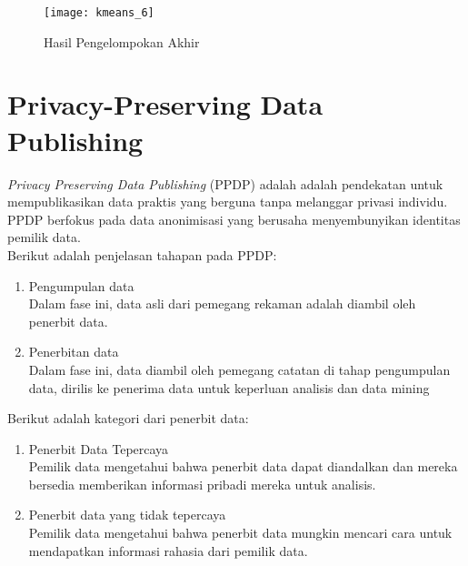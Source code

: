 \begin{enumerate}
\begin{figure}[H]
	\centering
	\texttt{[image: kmeans\_6]}
	\caption{Hasil Pengelompokan Akhir}
	\label{fig:kmeans_6}
\end{figure}



\end{enumerate}

\section{Privacy-Preserving Data Publishing} 
\textit{Privacy Preserving Data Publishing} (PPDP) adalah adalah pendekatan untuk mempublikasikan data praktis yang berguna tanpa melanggar privasi individu. PPDP berfokus pada data anonimisasi yang berusaha menyembunyikan identitas pemilik data.
\\

\noindent Berikut adalah penjelasan tahapan pada PPDP:

\begin{enumerate}

\item Pengumpulan data \\
Dalam fase ini, data asli dari pemegang rekaman adalah diambil oleh penerbit data.

\item Penerbitan data \\
Dalam fase ini, data diambil oleh pemegang catatan di tahap pengumpulan data, dirilis ke penerima data untuk keperluan analisis dan data mining

\end{enumerate}

\noindent Berikut adalah kategori dari penerbit data:
\begin{enumerate}

\item Penerbit Data Tepercaya \\
Pemilik data mengetahui bahwa penerbit data dapat diandalkan dan mereka bersedia memberikan informasi pribadi mereka untuk analisis.

\item Penerbit data yang tidak tepercaya\\
Pemilik data mengetahui bahwa penerbit data mungkin mencari cara untuk mendapatkan informasi rahasia dari pemilik data.

\end{enumerate}

